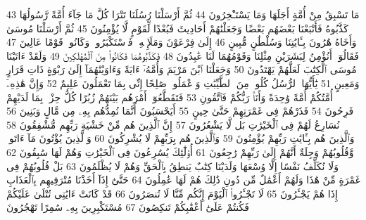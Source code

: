 {\tiny\colorbox{cl_aya}{43}} مَا تَسْبِقُ مِنْ أُمَّةٍ أَجَلَهَا وَمَا يَسْتَـْٔخِرُونَ
{\tiny\colorbox{cl_aya}{44}} ثُمَّ أَرْسَلْنَا رُسُلَنَا تَتْرَا كُلَّ مَا جَآءَ أُمَّةً رَّسُولُهَا كَذَّبُوهُ فَأَتْبَعْنَا بَعْضَهُم بَعْضًا وَجَعَلْنَٰهُمْ أَحَادِيثَ فَبُعْدًا لِّقَوْمٍ لَّا يُؤْمِنُونَ
{\tiny\colorbox{cl_aya}{45}} ثُمَّ أَرْسَلْنَا مُوسَىٰ وَأَخَاهُ هَٰرُونَ بِـَٔايَٰتِنَا وَسُلْطَٰنٍ مُّبِينٍ
{\tiny\colorbox{cl_aya}{46}} إِلَىٰ فِرْعَوْنَ وَمَلَإِي۟هِۦ فَٱسْتَكْبَرُوا۟ وَكَانُوا۟ قَوْمًا عَالِينَ
{\tiny\colorbox{cl_aya}{47}} فَقَالُوٓا۟ أَنُؤْمِنُ لِبَشَرَيْنِ مِثْلِنَا وَقَوْمُهُمَا لَنَا عَٰبِدُونَ
{\tiny\colorbox{cl_aya}{48}} فَكَذَّبُوهُمَا فَكَانُوا۟ مِنَ ٱلْمُهْلَكِينَ
{\tiny\colorbox{cl_aya}{49}} وَلَقَدْ ءَاتَيْنَا مُوسَى ٱلْكِتَٰبَ لَعَلَّهُمْ يَهْتَدُونَ
{\tiny\colorbox{cl_aya}{50}} وَجَعَلْنَا ٱبْنَ مَرْيَمَ وَأُمَّهُۥٓ ءَايَةً وَءَاوَيْنَٰهُمَآ إِلَىٰ رَبْوَةٍ ذَاتِ قَرَارٍ وَمَعِينٍ
{\tiny\colorbox{cl_aya}{51}} يَٰٓأَيُّهَا ٱلرُّسُلُ كُلُوا۟ مِنَ ٱلطَّيِّبَٰتِ وَٱعْمَلُوا۟ صَٰلِحًا إِنِّى بِمَا تَعْمَلُونَ عَلِيمٌ
{\tiny\colorbox{cl_aya}{52}} وَإِنَّ هَٰذِهِۦٓ أُمَّتُكُمْ أُمَّةً وَٰحِدَةً وَأَنَا۠ رَبُّكُمْ فَٱتَّقُونِ
{\tiny\colorbox{cl_aya}{53}} فَتَقَطَّعُوٓا۟ أَمْرَهُم بَيْنَهُمْ زُبُرًا كُلُّ حِزْبٍۭ بِمَا لَدَيْهِمْ فَرِحُونَ
{\tiny\colorbox{cl_aya}{54}} فَذَرْهُمْ فِى غَمْرَتِهِمْ حَتَّىٰ حِينٍ
{\tiny\colorbox{cl_aya}{55}} أَيَحْسَبُونَ أَنَّمَا نُمِدُّهُم بِهِۦ مِن مَّالٍ وَبَنِينَ
{\tiny\colorbox{cl_aya}{56}} نُسَارِعُ لَهُمْ فِى ٱلْخَيْرَٰتِ بَل لَّا يَشْعُرُونَ
{\tiny\colorbox{cl_aya}{57}} إِنَّ ٱلَّذِينَ هُم مِّنْ خَشْيَةِ رَبِّهِم مُّشْفِقُونَ
{\tiny\colorbox{cl_aya}{58}} وَٱلَّذِينَ هُم بِـَٔايَٰتِ رَبِّهِمْ يُؤْمِنُونَ
{\tiny\colorbox{cl_aya}{59}} وَٱلَّذِينَ هُم بِرَبِّهِمْ لَا يُشْرِكُونَ
{\tiny\colorbox{cl_aya}{60}} وَٱلَّذِينَ يُؤْتُونَ مَآ ءَاتَوا۟ وَّقُلُوبُهُمْ وَجِلَةٌ أَنَّهُمْ إِلَىٰ رَبِّهِمْ رَٰجِعُونَ
{\tiny\colorbox{cl_aya}{61}} أُو۟لَٰٓئِكَ يُسَٰرِعُونَ فِى ٱلْخَيْرَٰتِ وَهُمْ لَهَا سَٰبِقُونَ
{\tiny\colorbox{cl_aya}{62}} وَلَا نُكَلِّفُ نَفْسًا إِلَّا وُسْعَهَا وَلَدَيْنَا كِتَٰبٌ يَنطِقُ بِٱلْحَقِّ وَهُمْ لَا يُظْلَمُونَ
{\tiny\colorbox{cl_aya}{63}} بَلْ قُلُوبُهُمْ فِى غَمْرَةٍ مِّنْ هَٰذَا وَلَهُمْ أَعْمَٰلٌ مِّن دُونِ ذَٰلِكَ هُمْ لَهَا عَٰمِلُونَ
{\tiny\colorbox{cl_aya}{64}} حَتَّىٰٓ إِذَآ أَخَذْنَا مُتْرَفِيهِم بِٱلْعَذَابِ إِذَا هُمْ يَجْـَٔرُونَ
{\tiny\colorbox{cl_aya}{65}} لَا تَجْـَٔرُوا۟ ٱلْيَوْمَ إِنَّكُم مِّنَّا لَا تُنصَرُونَ
{\tiny\colorbox{cl_aya}{66}} قَدْ كَانَتْ ءَايَٰتِى تُتْلَىٰ عَلَيْكُمْ فَكُنتُمْ عَلَىٰٓ أَعْقَٰبِكُمْ تَنكِصُونَ
{\tiny\colorbox{cl_aya}{67}} مُسْتَكْبِرِينَ بِهِۦ سَٰمِرًا تَهْجُرُونَ

